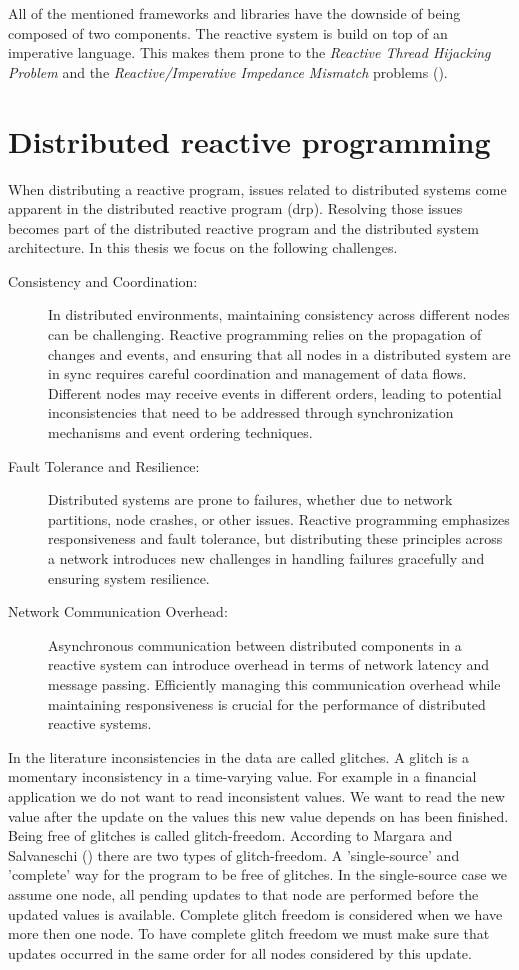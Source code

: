 \documentclass[a4paper]{book}
\begin{document}
All of the mentioned frameworks and libraries have the downside of being composed of two components. The reactive system is build on top of an imperative language. This makes them prone to the \textit{Reactive Thread Hijacking Problem} and the \textit{Reactive/Imperative Impedance Mismatch} problems (\cite{vonder_tackling_2020}).

\section{Distributed reactive programming} \label{sec:drp}

When distributing a reactive program, issues related to distributed systems come apparent in the distributed reactive program (drp). Resolving those issues becomes part of the distributed reactive program and the distributed system architecture. In this thesis we focus on the following challenges.
\begin{description}
	\item[Consistency and Coordination:] In distributed environments, maintaining consistency across different nodes can be challenging. Reactive programming relies on the propagation of changes and events, and ensuring that all nodes in a distributed system are in sync requires careful coordination and management of data flows. Different nodes may receive events in different orders, leading to potential inconsistencies that need to be addressed through synchronization mechanisms and event ordering techniques. 
	\item[Fault Tolerance and Resilience:] Distributed systems are prone to failures, whether due to network partitions, node crashes, or other issues. Reactive programming emphasizes responsiveness and fault tolerance, but distributing these principles across a network introduces new challenges in handling failures gracefully and ensuring system resilience.
	\item[Network Communication Overhead:] Asynchronous communication between distributed components in a reactive system can introduce overhead in terms of network latency and message passing. Efficiently managing this communication overhead while maintaining responsiveness is crucial for the performance of distributed reactive systems.
	
\end{description}

In the literature inconsistencies in the data are called glitches. A glitch is a momentary inconsistency in a time-varying value. For example in a financial application we do not want to read inconsistent values. We want to read the new value after the update on the values this new value depends on has been finished. Being free of glitches is called glitch-freedom. According to Margara and Salvaneschi (\cite{DBLP:journals/tse/MargaraS18}) there are two types of glitch-freedom. A 'single-source' and 'complete' way for the program to be free of glitches. In the single-source case we assume one node, all pending updates to that node are performed before the updated values is available. Complete glitch freedom is considered when we have more then one node. To have complete glitch freedom we must make sure that updates occurred in the same order for all nodes considered by this update. 
\end{document}
